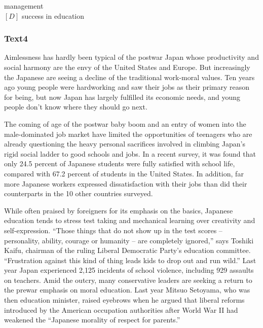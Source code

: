 \documentclass[a4paper]{article}
\begin{document}
management\\$[D]$ success in education\\\subsubsection{Text4}

\par
Aimlessness has hardly been typical of the postwar Japan whose productivity and social harmony are the envy of the United States and Europe. But increasingly the Japanese are seeing a decline of the traditional work-moral values. Ten years ago young people were hardworking and saw their jobs as their primary reason for being, but now Japan has largely fulfilled its economic needs, and young people don’t know where they should go next.

\par
The coming of age of the postwar baby boom and an entry of women into the male-dominated job market have limited the opportunities of teenagers who are already questioning the heavy personal sacrifices involved in climbing Japan’s rigid social ladder to good schools and jobs. In a recent survey, it was found that only 24.5 percent of Japanese students were fully satisfied with school life, compared with 67.2 percent of students in the United States. In addition, far more Japanese workers expressed dissatisfaction with their jobs than did their counterparts in the 10 other countries surveyed.

\par
While often praised by foreigners for its emphasis on the basics, Japanese education tends to stress test taking and mechanical learning over creativity and self-expression. “Those things that do not show up in the test scores -- personality, ability, courage or humanity -- are completely ignored,” says Toshiki Kaifu, chairman of the ruling Liberal Democratic Party’s education committee. “Frustration against this kind of thing leads kids to drop out and run wild.” Last year Japan experienced 2,125 incidents of school violence, including 929 assaults on teachers. Amid the outcry, many conservative leaders are seeking a return to the prewar emphasis on moral education. Last year Mitsuo Setoyama, who was then education minister, raised eyebrows when he argued that liberal reforms introduced by the American occupation authorities after World War II had weakened the “Japanese morality of respect for parents.”
\end{document}
